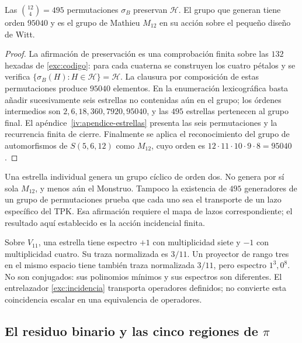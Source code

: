 \begin{proposition}
\label{exc:m12}
Las $\binom{12}4=495$ permutaciones $\sigma_B$ preservan $\mathcal H$.
El grupo que generan tiene orden $95040$ y es el grupo de Mathieu
$M_{12}$ en su acción sobre el pequeño diseño de Witt.
\end{proposition}

\begin{proof}
La afirmación de preservación es una comprobación finita sobre las
$132$ hexadas de \eqref{exc:codigo}: para cada cuaterna se construyen
los cuatro pétalos y se verifica
$\{\sigma_B(H):H\in\mathcal H\}=\mathcal H$.
La clausura por composición de estas permutaciones produce $95040$
elementos. En la enumeración lexicográfica basta añadir sucesivamente
seis estrellas no contenidas aún en el grupo; los órdenes intermedios
son $2,6,18,360,7920,95040$, y las $495$ estrellas pertenecen al grupo
final. El apéndice~\ref{iv:apendice-estrellas} presenta las seis
permutaciones y la recurrencia finita de cierre. Finalmente se aplica el reconocimiento
del grupo de automorfismos de $S(5,6,12)$ como $M_{12}$, cuyo orden es
$12\cdot11\cdot10\cdot9\cdot8=95040$.
\end{proof}

Una estrella individual genera un grupo cíclico de orden dos. No
genera por sí sola $M_{12}$, y menos aún el Monstruo. Tampoco la
existencia de $495$ generadores de un grupo de permutaciones prueba que
cada uno sea el transporte de un lazo específico del TPK. Esa afirmación
requiere el mapa de lazos correspondiente; el resultado aquí establecido
es la acción incidencial finita.

\begin{remark}
Sobre $V_{11}$, una estrella tiene espectro $+1$ con multiplicidad siete
y $-1$ con multiplicidad cuatro. Su traza normalizada es $3/11$.
Un proyector de rango tres en el mismo espacio tiene también traza
normalizada $3/11$, pero espectro $1^3,0^8$. No son conjugados: sus
polinomios mínimos y sus espectros son diferentes. El entrelazador
\eqref{exc:incidencia} transporta operadores definidos; no convierte
esta coincidencia escalar en una equivalencia de operadores.
\end{remark}

\subsection{El residuo binario y las cinco regiones de \texorpdfstring{$\pi$}{pi}}
\label{exc:cinco-regiones}


